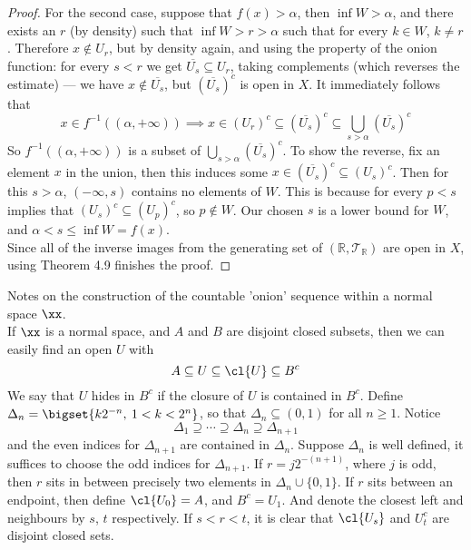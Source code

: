 \documentclass[../main-v2-manifolds.tex]{subfiles}
\begin{document}
\begin{proof}
For the second case, suppose that $f(x)>\alpha$, then $\inf W>\alpha$, and there exists an $r$ (by density) such that $\inf W>r>\alpha$ such that for every $k\in W$, $k\neq r$. Therefore $x\notin U_r$, but by density again, and using the property of the onion function: for every $s<r$ we get $\overline{U_s}\subseteq U_r$, taking complements (which reverses the estimate) — we have $x\notin \overline{U_s}$, but $\left(\overline{U_s}\right)^c$ is open in $X$. It immediately follows that
\[
x\in f^{-1}((\alpha,+\infty))\implies x\in (U_r)^c\subseteq \left(\overline{U_s}\right)^c\subseteq\bigcup_{s>\alpha}\left(\overline{U_s}\right)^c
\]
So $f^{-1}((\alpha,+\infty))$ is a subset of $\bigcup_{s>\alpha}\left(\overline{U_s}\right)^c$. To show the reverse, fix an element $x$ in the union, then this induces some $x\in \left(\overline{U_s}\right)^c\subseteq (U_s)^c$. Then for this $s>\alpha$, $(-\infty,s)$ contains no elements of $W$. This is because for every $p<s$ implies that $(U_s)^c\subseteq(U_p)^c$, so $p\notin W$. Our chosen $s$ is a lower bound for $W$, and $\alpha<s\leq\inf W =f(x)$.\\

Since all of the inverse images from the generating set of $(\mathbb{R},\mathcal{T}_{\mathbb{R}})$ are open in $X$, using Theorem 4.9 finishes the proof.
\end{proof}

Notes on the construction of the countable 'onion' sequence within a normal space $\xx$.\\

If $\xx$ is a normal space, and $A$ and $B$ are disjoint closed subsets, then we can easily find an open $U$ with
\begin{equation}\label{eq:UrysohnLemma-Seashells}
    A\subseteq U \subseteq \cl{U}\subseteq B^c
\end{equation}
We say that $U$ hides in $B^c$ if the closure of $U$ is contained in $B^c$. Define $\Delta_n = \bigset{k2^{-n},\: 1 < k < 2^{n}}$, so that $\Delta_n\subseteq(0,1)$ for all $n\geq 1$. Notice 
\[
    \Delta_1\supseteq \cdots\supseteq \Delta_n\supseteq \Delta_{n+1}
\]
and the even indices for $\Delta_{n+1}$ are contained in $\Delta_n$. Suppose $\Delta_n$ is well defined, it suffices to choose the odd indices for $\Delta_{n+1}$. If $r = j2^{-(n+1)}$, where $j$ is odd, then $r$ sits in between precisely two elements in $\Delta_n\cup\{0,1\}$. If $r$ sits between an endpoint, then define $\cl{U_0} = A$, and $B^c = U_1$. And denote the closest left and neighbours by $s$, $t$ respectively. If $s<r<t$, it is clear that $\cl{U_s}$ and $U_t^c$ are disjoint closed sets.\\
\end{document}
